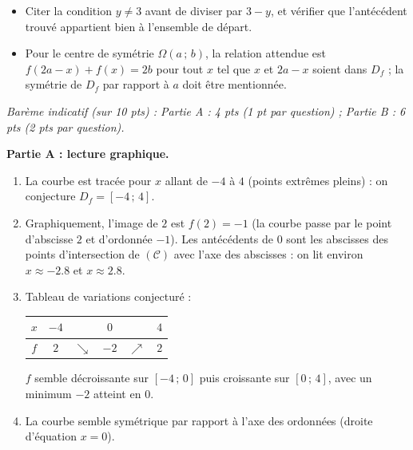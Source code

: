 \documentclass[11pt]{article}
\begin{document}
\begin{attention}
\begin{itemize}
\item Citer la condition $y\neq 3$ avant de diviser par $3-y$, et vérifier que l'antécédent trouvé appartient bien à l'ensemble de départ.
\item Pour le centre de symétrie $\Omega(a\,;\,b)$, la relation attendue est $f(2a-x)+f(x)=2b$ pour tout $x$ tel que $x$ et $2a-x$ soient dans $D_f$ ; la symétrie de $D_f$ par rapport à $a$ doit être mentionnée.
\end{itemize}
\end{attention}

\begin{corrige}
\emph{Barème indicatif (sur 10 pts) : Partie A : 4 pts (1 pt par question) ; Partie B : 6 pts (2 pts par question).}

\textbf{Partie A : lecture graphique.}
\begin{enumerate}
\item La courbe est tracée pour $x$ allant de $-4$ à $4$ (points extrêmes pleins) : on conjecture $D_f=[-4\,;\,4]$.
\item Graphiquement, l'image de $2$ est $f(2)=-1$ (la courbe passe par le point d'abscisse $2$ et d'ordonnée $-1$). Les antécédents de $0$ sont les abscisses des points d'intersection de $(\mathcal{C})$ avec l'axe des abscisses : on lit environ $x\approx -\num{2,8}$ et $x\approx \num{2,8}$.
\item Tableau de variations conjecturé :
\begin{center}
\begin{tabular}{|c|ccccc|}\hline
$x$ & $-4$ & & $0$ & & $4$ \\ \hline
$f$ & $2$ & $\searrow$ & $-2$ & $\nearrow$ & $2$ \\ \hline
\end{tabular}
\end{center}
$f$ semble décroissante sur $[-4\,;\,0]$ puis croissante sur $[0\,;\,4]$, avec un minimum $-2$ atteint en $0$.
\item La courbe semble symétrique par rapport à l'axe des ordonnées (droite d'équation $x=0$).
\end{enumerate}


\end{corrige}
\end{document}

